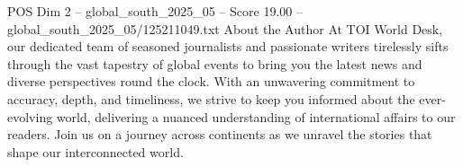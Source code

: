 \begin{textsample}{POS Dim 2 – global\_south\_2025\_05 – Score 19.00 – global\_south\_2025\_05/125211049.txt}
About the Author At TOI World Desk, our dedicated team of seasoned journalists and passionate writers tirelessly sifts through the vast tapestry of global events to bring you the latest news and diverse perspectives round the clock.
With an unwavering commitment to accuracy, depth, and timeliness, we strive to keep you informed about the ever-evolving world, delivering a nuanced understanding of international affairs to our readers.
Join us on a journey across continents as we unravel the stories that shape our interconnected world.

\end{textsample}
